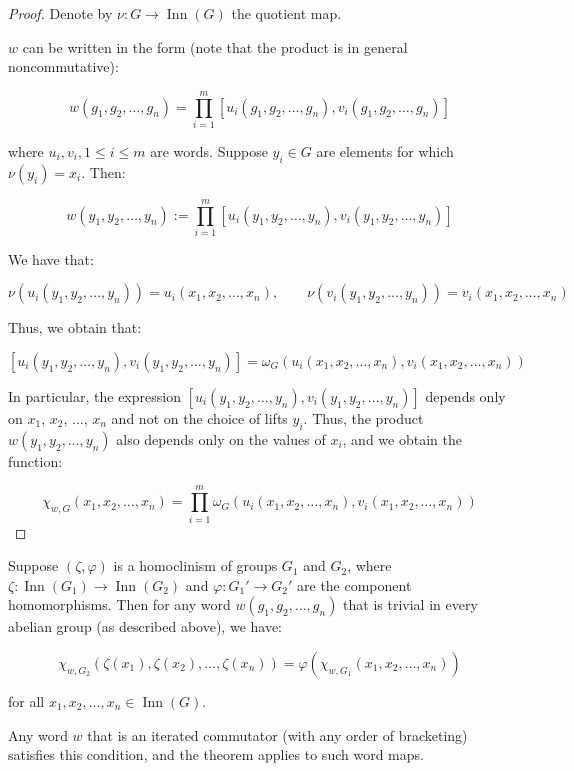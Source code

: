 \begin{proof}
  Denote by $\nu:G \to \operatorname{Inn}(G)$ the quotient map.

  $w$ can be written in the form (note that the product is in general
  noncommutative):

  $$w(g_1,g_2,\dots,g_n) = \prod_{i=1}^m[u_i(g_1,g_2,\dots,g_n),v_i(g_1,g_2,\dots,g_n)]$$

  where $u_i,v_i, 1 \le i \le m$ are words. Suppose $y_i \in G$ are
  elements for which $\nu(y_i) = x_i$. Then:

  $$w(y_1,y_2,\dots,y_n) := \prod_{i=1}^m[u_i(y_1,y_2,\dots,y_n),v_i(y_1,y_2,\dots,y_n)]$$

  We have that:

  $$\nu(u_i(y_1,y_2,\dots,y_n)) = u_i(x_1,x_2,\dots,x_n), \qquad \nu(v_i(y_1,y_2,\dots,y_n)) = v_i(x_1,x_2,\dots,x_n)$$

  Thus, we obtain that:

  $$[u_i(y_1,y_2,\dots,y_n),v_i(y_1,y_2,\dots,y_n)] = \omega_G(u_i(x_1,x_2,\dots,x_n),v_i(x_1,x_2,\dots,x_n))$$

  In particular, the expression
  $[u_i(y_1,y_2,\dots,y_n),v_i(y_1,y_2,\dots,y_n)]$ depends only on
  $x_1$, $x_2$, $\dots$, $x_n$ and not on the choice of lifts $y_i$. Thus, the
  product $w(y_1,y_2,\dots,y_n)$ also depends only on the values of
  $x_i$, and we obtain the function:

  $$\chi_{w,G}(x_1,x_2,\dots,x_n) = \prod_{i=1}^m \omega_G(u_i(x_1,x_2,\dots,x_n),v_i(x_1,x_2,\dots,x_n))$$
\end{proof}


\begin{theorem}\label{thm:iterated-commutator-commutes-homoclinisms}
  Suppose $(\zeta,\varphi)$ is a homoclinism of groups $G_1$ and
  $G_2$, where $\zeta:\operatorname{Inn}(G_1) \to
  \operatorname{Inn}(G_2)$ and $\varphi:G_1' \to G_2'$ are the
  component homomorphisms. Then for any word $w(g_1,g_2,\dots,g_n)$
  that is trivial in every abelian group (as described above), we have:

  $$\chi_{w,G_2}(\zeta(x_1),\zeta(x_2),\dots,\zeta(x_n)) = \varphi(\chi_{w,G_1}(x_1,x_2,\dots,x_n))$$

  for all $x_1,x_2,\dots,x_n \in \operatorname{Inn}(G)$.

  Any word $w$ that is an iterated commutator (with any order of
  bracketing) satisfies this condition, and the theorem applies to
  such word maps.
\end{theorem}

